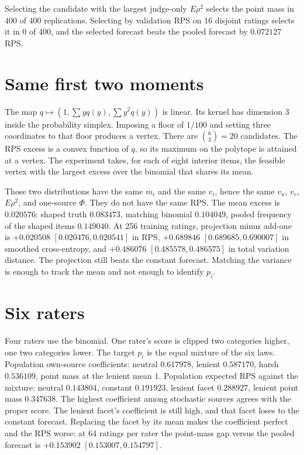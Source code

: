 \documentclass[11pt]{article}
\begin{document}
Selecting the candidate with the largest judge-only $E\rho^2$ selects the point mass in 400 of 400 replications. Selecting by validation RPS on 16 disjoint ratings selects it in 0 of 400, and the selected forecast beats the pooled forecast by $0.072127$ RPS.

\section{Same first two moments}

The map $q\mapsto (1,\sum yq(y),\sum y^2 q(y))$ is linear. Its kernel has dimension 3 inside the probability simplex. Imposing a floor of $1/100$ and setting three coordinates to that floor produces a vertex. There are $\binom{6}{3}=20$ candidates. The RPS excess is a convex function of $q$, so its maximum on the polytope is attained at a vertex. The experiment takes, for each of eight interior items, the feasible vertex with the largest excess over the binomial that shares its mean.

Those two distributions have the same $m_i$ and the same $v_i$, hence the same $v_u$, $v_e$, $E\rho^2$, and one-source $\Phi$. They do not have the same RPS. The mean excess is $0.020576$: shaped truth $0.083473$, matching binomial $0.104049$, pooled frequency of the shaped items $0.149040$. At 256 training ratings, projection minus add-one is $+0.020508$ $[0.020476,0.020541]$ in RPS, $+0.689846$ $[0.689685,0.690007]$ in smoothed cross-entropy, and $+0.486076$ $[0.485578,0.486575]$ in total variation distance. The projection still beats the constant forecast. Matching the variance is enough to track the mean and not enough to identify $p_i$.

\section{Six raters}

Four raters use the binomial. One rater's score is clipped two categories higher, one two categories lower. The target $p_i$ is the equal mixture of the six laws. Population own-source coefficients: neutral $0.617978$, lenient $0.587170$, harsh $0.536109$, point mass at the lenient mean $1$. Population expected RPS against the mixture: neutral $0.143804$, constant $0.191923$, lenient facet $0.288927$, lenient point mass $0.347638$. The highest coefficient among stochastic sources agrees with the proper score. The lenient facet's coefficient is still high, and that facet loses to the constant forecast. Replacing the facet by its mean makes the coefficient perfect and the RPS worse: at 64 ratings per rater the point-mass gap versus the pooled forecast is $+0.153902$ $[0.153007,0.154797]$.
\end{document}
